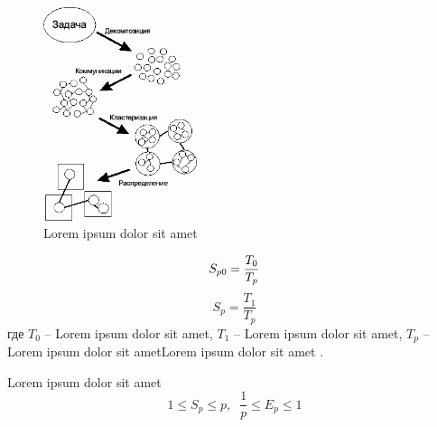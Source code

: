 \subsection{}



\begin{figure}[ht!]
	\includegraphics[width=0.4\textwidth]{img/img1.png}
	\caption{Lorem ipsum dolor sit amet}
	\label{fig:spire05}
\end{figure}


\begin{equation}
S_{p0}=\frac{T_{0} }{T_{p}} \\
\label{F:100}
\end{equation}
\begin{equation}
S_{p}=\frac{T_{1} }{T_{p}}
\label{F:101}
\end{equation}
где $T_{0}$ -- Lorem ipsum dolor sit amet, $T_{1}$ -- Lorem ipsum dolor sit amet, $T_{p}$ -- Lorem ipsum dolor sit ametLorem ipsum dolor sit amet \cite{b1}. 

Lorem ipsum dolor sit amet
\begin{equation}
1\leq S_{p} \leq p,\; \;  \frac{1}{p} \leq E_{p} \leq 1
\label{F:103}
\end{equation}



